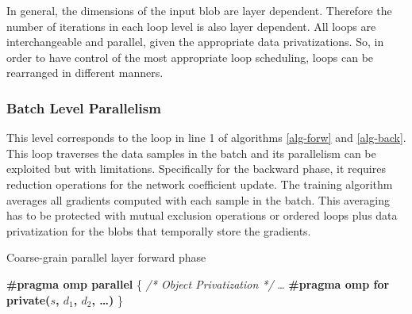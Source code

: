 In general, the dimensions of the input blob are layer dependent. Therefore the number of iterations in each loop level is also layer dependent. All loops are 
interchangeable and parallel, given the appropriate data privatizations. 
So, in order to have control of the most appropriate loop scheduling, 
loops can be rearranged in different manners. 

\subsubsection{Batch Level Parallelism}
This level corresponds to the loop in line 1 of algorithms \ref{alg-forw}
and \ref{alg-back}. 
This loop traverses the data samples in the batch and its parallelism 
can be exploited but with limitations. 
Specifically for the backward phase, it requires reduction operations 
for the network coefficient update. The training algorithm averages all 
gradients computed with each sample in the batch. This averaging
has to be protected with mutual exclusion operations or ordered
loops plus data privatization for the blobs that temporally store the
gradients. 



\begin{algorithm}
\caption{Coarse-grain parallel layer forward phase}
\label{alg-par-forw}
\BlankLine
\textbf{\#pragma omp parallel}
\BlankLine
\{
\BlankLine
\emph{/* Object Privatization */}
\BlankLine
\dots
\BlankLine
\textbf{\#pragma omp for private($s$, $d_1$, $d_2$, \dots)}
\BlankLine
{}
\}
\end{algorithm}

